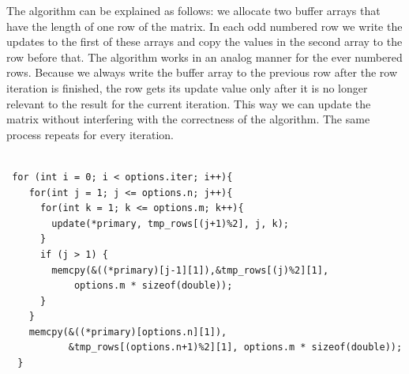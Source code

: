 \documentclass[11pt]{article}
\begin{document}
The algorithm can be explained as follows: we allocate two buffer arrays that have the length of one row of the matrix. In each odd numbered row we write the updates to the first of these arrays and copy the values in the second array to the row before that.
The algorithm works in an analog manner for the ever numbered rows. Because we always write the buffer array to the previous row after the row iteration is finished, the row gets its update value only after it is no longer relevant to the result for the current iteration.
This way we can update the matrix without interfering with the correctness of the algorithm. The same process repeats for every iteration.
\begin{lstlisting}[label=some-code, caption=Space efficient iteration loop]

 for (int i = 0; i < options.iter; i++){
    for(int j = 1; j <= options.n; j++){
      for(int k = 1; k <= options.m; k++){
        update(*primary, tmp_rows[(j+1)%2], j, k);
      }
      if (j > 1) {
        memcpy(&((*primary)[j-1][1]),&tmp_rows[(j)%2][1], 
            options.m * sizeof(double));
      }
    }
    memcpy(&((*primary)[options.n][1]),
           &tmp_rows[(options.n+1)%2][1], options.m * sizeof(double));
  }

\end{lstlisting}
\end{document}
